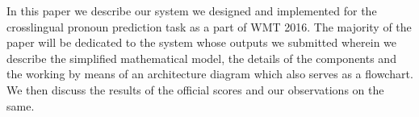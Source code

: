 In this paper we describe our system we designed and implemented for the crosslingual pronoun prediction task as a part of WMT 2016. The majority of the paper will be dedicated to the system whose outputs we submitted wherein we describe the simplified mathematical model, the details of the components and the working by means of an architecture diagram which also serves as a flowchart. We then discuss the results of the official scores and our observations on the same.
